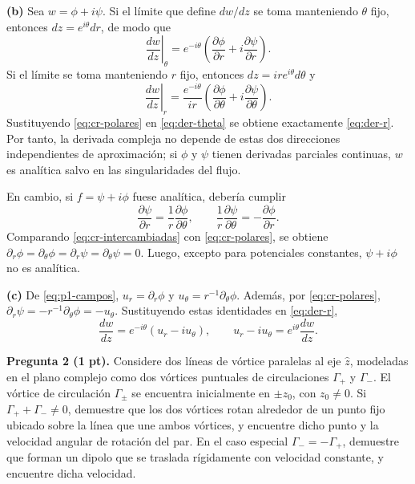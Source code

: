 \documentclass[11pt]{article}
\newcommand{\inciso}[1]{\vspace{0.35em}\noindent\textbf{(#1)}\enspace}
\begin{document}
\inciso{b} Sea $w=\phi+i\psi$. Si el límite que define $dw/dz$ se toma manteniendo $\theta$ fijo, entonces $dz=e^{i\theta}dr$, de modo que
\begin{equation}
\left.\frac{dw}{dz}\right|_{\theta}=e^{-i\theta}
\left(\frac{\partial\phi}{\partial r}+i\frac{\partial\psi}{\partial r}\right).
\label{eq:der-r}
\end{equation}
Si el límite se toma manteniendo $r$ fijo, entonces $dz=ire^{i\theta}d\theta$ y
\begin{equation}
\left.\frac{dw}{dz}\right|_{r}=\frac{e^{-i\theta}}{ir}
\left(\frac{\partial\phi}{\partial\theta}+i\frac{\partial\psi}{\partial\theta}\right).
\label{eq:der-theta}
\end{equation}
Sustituyendo \eqref{eq:cr-polares} en \eqref{eq:der-theta} se obtiene exactamente \eqref{eq:der-r}. Por tanto, la derivada compleja no depende de estas dos direcciones independientes de aproximación; si $\phi$ y $\psi$ tienen derivadas parciales continuas, $w$ es analítica salvo en las singularidades del flujo.

En cambio, si $f=\psi+i\phi$ fuese analítica, debería cumplir
\begin{equation}
\frac{\partial\psi}{\partial r}=\frac1r\frac{\partial\phi}{\partial\theta},
\qquad
\frac1r\frac{\partial\psi}{\partial\theta}=-\frac{\partial\phi}{\partial r}.
\label{eq:cr-intercambiadas}
\end{equation}
Comparando \eqref{eq:cr-intercambiadas} con \eqref{eq:cr-polares}, se obtiene $\partial_r\phi=\partial_\theta\phi=\partial_r\psi=\partial_\theta\psi=0$. Luego, excepto para potenciales constantes, $\psi+i\phi$ no es analítica.

\inciso{c} De \eqref{eq:p1-campos}, $u_r=\partial_r\phi$ y $u_\theta=r^{-1}\partial_\theta\phi$. Además, por \eqref{eq:cr-polares}, $\partial_r\psi=-r^{-1}\partial_\theta\phi=-u_\theta$. Sustituyendo estas identidades en \eqref{eq:der-r},
\begin{equation}
\frac{dw}{dz}=e^{-i\theta}(u_r-iu_\theta),
\qquad
u_r-iu_\theta=e^{i\theta}\frac{dw}{dz}.
\label{eq:vel-polar-compleja}
\end{equation}

\noindent\textbf{Pregunta 2 (1 pt).} Considere dos líneas de vórtice paralelas al eje $\hat z$, modeladas en el plano complejo como dos vórtices puntuales de circulaciones $\Gamma_+$ y $\Gamma_-$. El vórtice de circulación $\Gamma_\pm$ se encuentra inicialmente en $\pm z_0$, con $z_0\neq0$. Si $\Gamma_++\Gamma_-\neq0$, demuestre que los dos vórtices rotan alrededor de un punto fijo ubicado sobre la línea que une ambos vórtices, y encuentre dicho punto y la velocidad angular de rotación del par. En el caso especial $\Gamma_-=-\Gamma_+$, demuestre que forman un dipolo que se traslada rígidamente con velocidad constante, y encuentre dicha velocidad.
\end{document}
